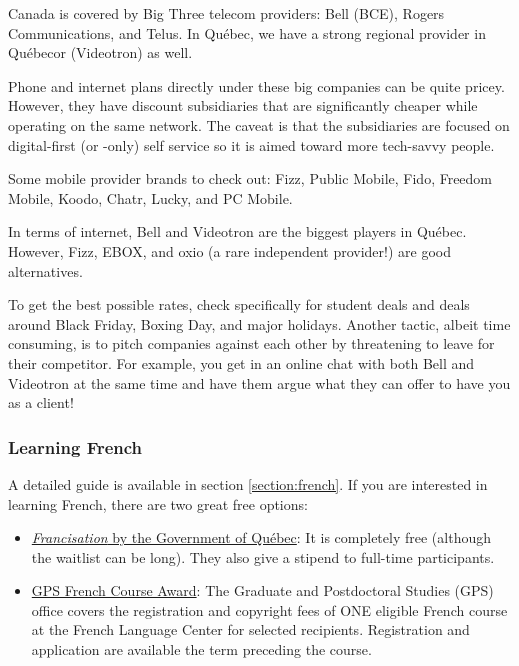Canada is covered by Big Three telecom providers: Bell (BCE), Rogers Communications, and Telus. In Québec, we have a strong regional provider in Qu\'ebecor (Videotron) as well.

Phone and internet plans directly under these big companies can be quite pricey. However, they have discount subsidiaries that are significantly cheaper while operating on the same network. The caveat is that the subsidiaries are focused on digital-first (or -only) self service so it is aimed toward more tech-savvy people.

Some mobile provider brands to check out: Fizz, Public Mobile, Fido, Freedom Mobile, Koodo, Chatr, Lucky, and PC Mobile.

In terms of internet, Bell and Videotron are the biggest players in Québec. However, Fizz, EBOX, and oxio (a rare independent provider!) are good alternatives.

To get the best possible rates, check specifically for student deals and deals around Black Friday, Boxing Day, and major holidays. Another tactic, albeit time consuming, is to pitch companies against each other by threatening to leave for their competitor. For example, you get in an online chat with both Bell and Videotron at the same time and have them argue what they can offer to have you as a client!

\subsubsection{Learning French} 
A detailed guide is available in section \hyperref[section:french]{\textcolor{purble}{\ref*{section:french}}}. If you are interested in learning French, there are two great free options:
\begin{itemize}
    \item \href{https://www.quebec.ca/en/education/learn-french}{\textit{Francisation} by the Government of Qu\'ebec}: It is completely free (although the waitlist can be long). They also give a stipend to full-time participants.
    \item \href{https://www.mcgill.ca/skillsets/files/skillsets/gps_award_for_french_classes.pdf}{GPS French Course Award}: The Graduate and Postdoctoral Studies (GPS) office covers the registration and copyright fees of ONE eligible French course at the French Language Center for selected recipients. Registration and application are available the term preceding the course.  
\end{itemize}

